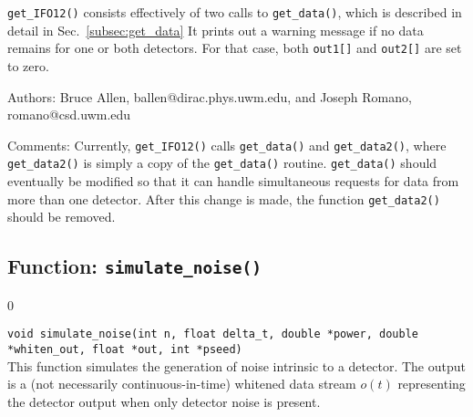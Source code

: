 {\tt get\_IFO12()} consists effectively of two calls to 
{\tt get\_data()}, which is described in detail in 
Sec.~\ref{subsec:get_data}
It prints out a warning message if no data remains for one or
both detectors.
For that case, both {\tt out1[]} and {\tt out2[]} are set to 
zero.
%
\begin{description}
\item{Authors:}
Bruce Allen, ballen@dirac.phys.uwm.edu, and Joseph Romano, romano@csd.uwm.edu
\item{Comments:} 
Currently, {\tt get\_IFO12()} calls {\tt get\_data()}
and {\tt get\_data2()}, where {\tt get\_data2()} is simply a copy of the
{\tt get\_data()} routine.  
{\tt get\_data()} should eventually be modified so that it can handle
simultaneous requests for data from more than one detector.
After this change is made, the function {\tt get\_data2()} should be 
removed.
\end{description}
\clearpage

\subsection{Function: {\tt simulate\_noise()}}
\label{subsec:simulate_noise}
\setcounter{equation}0

{\tt void simulate\_noise(int n, float delta\_t, double *power, 
double *whiten\_out, float *out, int *pseed)}\\
%
This function simulates the generation of noise intrinsic to a detector.
The output is a (not necessarily continuous-in-time)
whitened data stream $o(t)$ representing the detector output when 
only detector noise is present.

